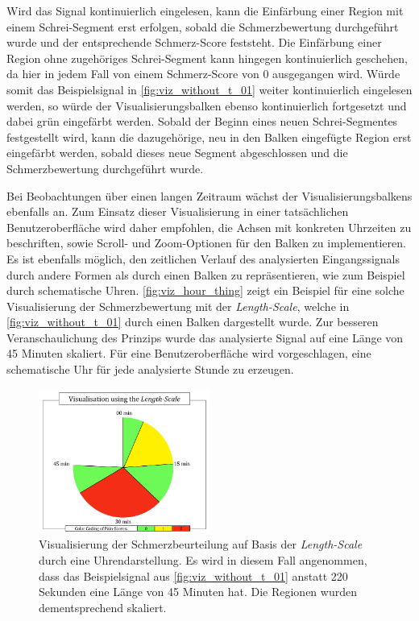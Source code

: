 Wird das Signal kontinuierlich eingelesen, kann die Einfärbung einer Region mit einem Schrei-Segment erst erfolgen, sobald die Schmerzbewertung durchgeführt wurde und der entsprechende Schmerz-Score feststeht. Die Einfärbung einer Region ohne zugehöriges Schrei-Segment kann hingegen kontinuierlich geschehen, da hier in jedem Fall von einem Schmerz-Score von 0 ausgegangen wird. Würde somit das Beispielsignal in \autoref{fig:viz_without_t_01} weiter kontinuierlich eingelesen werden, so würde der Visualisierungsbalken ebenso kontinuierlich fortgesetzt und dabei grün eingefärbt werden. Sobald der Beginn eines neuen Schrei-Segmentes festgestellt wird, kann die dazugehörige, neu in den Balken eingefügte Region erst eingefärbt werden, sobald dieses neue Segment abgeschlossen und die Schmerzbewertung durchgeführt wurde.

Bei Beobachtungen über einen langen Zeitraum wächst der Visualisierungsbalkens ebenfalls an. Zum Einsatz dieser Visualisierung in einer tatsächlichen Benutzeroberfläche wird daher empfohlen, die Achsen mit konkreten Uhrzeiten zu beschriften, sowie Scroll- und Zoom-Optionen für den Balken zu implementieren. Es ist ebenfalls möglich, den zeitlichen Verlauf des analysierten Eingangssignals durch andere Formen als durch einen Balken zu repräsentieren, wie zum Beispiel durch schematische Uhren. \autoref{fig:viz_hour_thing} zeigt ein Beispiel für eine solche Visualisierung der Schmerzbewertung mit der \emph{Length-Scale}, welche in \autoref{fig:viz_without_t_01} durch einen Balken dargestellt wurde. Zur besseren Veranschaulichung des Prinzips wurde das analysierte Signal auf eine Länge von 45 Minuten skaliert. Für eine Benutzeroberfläche wird vorgeschlagen, eine schematische Uhr für jede analysierte Stunde zu erzeugen.

\begin{figure}[h]
	\centering
	\includegraphics[width=0.5\textwidth]{bilder/visualisation_hour_02.png}
	\caption[Visualisierung der Schmerzbeurteilung durch eine schematische Uhr]{Visualisierung der Schmerzbeurteilung auf Basis der \emph{Length-Scale} durch eine Uhrendarstellung. Es wird in diesem Fall angenommen, dass das Beispielsignal aus \autoref{fig:viz_without_t_01} anstatt 220 Sekunden eine Länge von 45 Minuten hat. Die Regionen wurden dementsprechend skaliert.}
	\label{fig:viz_hour_thing}
\end{figure}

